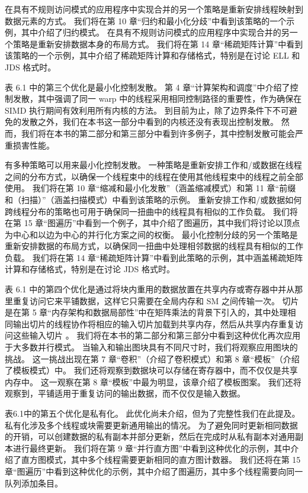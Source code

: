 在具有不规则访问模式的应用程序中实现合并的另一个策略是重新安排线程映射到数据元素的方式。 我们将在第 10 章“归约和最小化分歧”中看到该策略的一个示例，其中介绍了归约模式。 在具有不规则访问模式的应用程序中实现合并的另一个策略是重新安排数据本身的布局方式。 我们将在第 14 章“稀疏矩阵计算”中看到该策略的一个示例，其中介绍了稀疏矩阵计算和存储格式，特别是在讨论 ELL 和 JDS 格式时。

表 6.1 中的第三个优化是最小化控制发散。 第 4 章“计算架构和调度”中介绍了控制发散，其中强调了同一 warp 中的线程采用相同控制路径的重要性，作为确保在 SIMD 执行期间有效利用所有内核的方法。 到目前为止，除了边界条件下不可避免的发散之外，我们在本书这一部分中看到的内核还没有表现出控制发散。 然而，我们将在本书的第二部分和第三部分中看到许多例子，其中控制发散可能会严重损害性能。

有多种策略可以用来最小化控制发散。 一种策略是重新安排工作和/或数据在线程之间的分布方式，以确保一个线程束中的线程在使用其他线程束中的线程之前全部使用。 我们将在第 10 章“缩减和最小化发散”（涵盖缩减模式）和第 11 章“前缀和（扫描）”（涵盖扫描模式）中看到该策略的示例。 重新安排工作和/或数据如何跨线程分布的策略也可用于确保同一扭曲中的线程具有相似的工作负载。 我们将在第 15 章“图遍历”中看到一个例子，其中介绍了图遍历，其中我们将讨论以顶点为中心和以边为中心的并行化方案之间的权衡。 最小化控制分歧的另一个策略是重新安排数据的布局方式，以确保同一扭曲中处理相邻数据的线程具有相似的工作负载。 我们将在第 14 章“稀疏矩阵计算”中看到此策略的示例，其中涵盖稀疏矩阵计算和存储格式，特别是在讨论 JDS 格式时。

表 6.1 中的第四个优化是通过将块内重用的数据放置在共享内存或寄存器中并从那里重复访问它来平铺数据，这样它只需要在全局内存和 SM 之间传输一次。 切片是在第 5 章“内存架构和数据局部性”中在矩阵乘法的背景下引入的，其中处理相同输出切片的线程协作将相应的输入切片加载到共享内存，然后从共享内存重复访问这些输入切片 。 我们将在本书的第二部分和第三部分中看到这种优化再次应用于大多数并行模式。 当输入和输出图块具有不同尺寸时，我们将观察应用图块的挑战。 这一挑战出现在第 7 章“卷积”（介绍了卷积模式）和第 8 章“模板”（介绍了模板模式）中。 我们还将观察到数据块可以存储在寄存器中，而不仅仅是共享内存中。 这一观察在第 8 章“模板”中最为明显，该章介绍了模板图案。 我们还将观察到，平铺适用于重复访问的输出数据，而不仅仅是输入数据。

表6.1中的第五个优化是私有化。 此优化尚未介绍，但为了完整性我们在此提及。 私有化涉及多个线程或块需要更新通用输出的情况。 为了避免同时更新相同数据的开销，可以创建数据的私有副本并部分更新，然后在完成时从私有副本对通用副本进行最终更新。 我们将在第 9 章“并行直方图”中看到这种优化的示例，其中介绍了直方图模式，其中多个线程需要更新相同的直方图计数器。 我们还将在第 15 章“图遍历”中看到这种优化的示例，其中介绍了图遍历，其中多个线程需要向同一队列添加条目。

